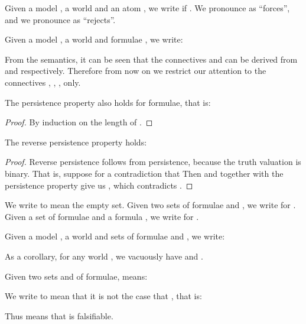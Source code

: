 \documentclass{llncs}
\numberwithin{equation}{section}
\begin{document}
\begin{definition}
Given a model , a world  and an atom , we write  if .
We pronounce  as ``forces'', and we pronounce  as ``rejects''.
\end{definition}

\begin{definition}\label{forcing}
Given a model , a world  and formulae , we write:

\end{definition}

From the semantics, it can be seen that the connectives  and  can be derived from  and  respectively. Therefore from now on we restrict our attention to the connectives , , ,  only.

\begin{lemma}
The persistence property also holds for formulae, that is:

\end{lemma}
\begin{proof}
By induction on the length of . 
\end{proof}

\begin{lemma}
The reverse persistence property holds:

\end{lemma}
\begin{proof}
Reverse persistence follows from persistence, because the truth valuation is binary. That is, suppose for a contradiction that 
Then  and  together with the persistence property give us , which contradicts .
\end{proof}

We write  to mean the empty set. Given two sets of formulae  and , we write  for . Given a set of formulae  and a formula , we write  for .

\begin{definition}
Given a model , a world  and sets of formulae  and , we write:

As a corollary, for any world , we vacuously have  and .
\end{definition}

\begin{definition}[Consequence]\label{consequence}
Given two sets  and  of formulae,  means:

We write  to mean that it is not the case that , that is:

Thus  means that  is falsifiable.
\end{definition}
\end{document}
